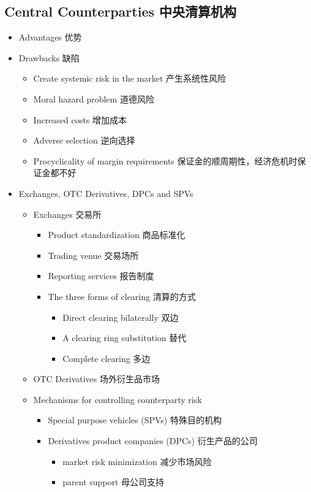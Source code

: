 \documentclass[a4paper,6pt,twoside,openany]{article}
\begin{document}
\subsection{Central Counterparties 中央清算机构}
\begin{itemize}
\item Advantages 优势
\item Drawbacks 缺陷
  \begin{itemize}
  \item Create systemic risk in the market 产生系统性风险
  \item Moral hazard problem 道德风险
  \item Increased costs 增加成本
  \item Adverse selection 逆向选择
    \item Procyclicality of margin requirements 保证金的顺周期性，经济危机时保证金都不好
  \end{itemize}
\item Exchanges, OTC Derivatives, DPCs and SPVs
  \begin{itemize}
  \item Exchanges 交易所
    \begin{itemize}
    \item Product standardization 商品标准化
    \item Trading venue 交易场所
    \item Reporting services 报告制度
    \item The three forms of clearing 清算的方式
      \begin{itemize}
      \item Direct clearing bilaterally 双边
      \item A clearing ring substitution 替代
      \item Complete clearing 多边
      \end{itemize}
    \end{itemize}
  \item OTC Derivatives 场外衍生品市场
  \item Mechanisms for controlling counterparty risk
    \begin{itemize}
    \item Special purpose vehicles (SPVs) 特殊目的机构
    \item Derivatives product companies (DPCs) 衍生产品的公司
      \begin{itemize}
      \item market risk minimization 减少市场风险
      \item parent support 母公司支持

\end{itemize}
\end{itemize}
\end{itemize}
\end{itemize}
\end{document}

